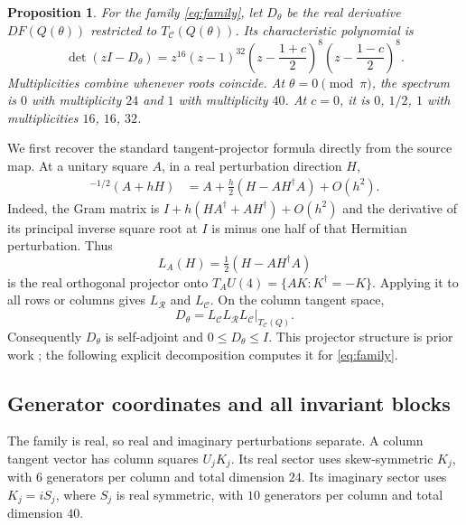\documentclass[11pt,a4paper]{article}
\newtheorem{proposition}{Proposition}
\newcommand{\adj}{^{\dagger}}
\newcommand{\TC}{T_{\mathcal C}}
\begin{document}
\begin{proposition}
\label{prop:spectrum}
For the family \eqref{eq:family}, let $D_\theta$ be the real derivative $DF(Q(\theta))$ restricted to $\TC(Q(\theta))$. Its characteristic polynomial is
\begin{equation}
 \det(zI-D_\theta)=z^{16}(z-1)^{32}
 \left(z-\frac{1+c}{2}\right)^8
 \left(z-\frac{1-c}{2}\right)^8.
 \label{eq:charpoly}
\end{equation}
Multiplicities combine whenever roots coincide. At $\theta=0\pmod\pi$, the spectrum is $0$ with multiplicity $24$ and $1$ with multiplicity $40$. At $c=0$, it is $0$, $1/2$, $1$ with multiplicities $16$, $16$, $32$.
\end{proposition}

We first recover the standard tangent-projector formula directly from the source map. At a unitary square $A$, in a real perturbation direction $H$,
\begin{align}
 [(A+hH)(A+hH)\adj]^{-1/2}(A+hH)
 &=A+\frac h2(H-AH\adj A)+O(h^2).
 \label{eq:derivative}
\end{align}
Indeed, the Gram matrix is $I+h(HA\adj+AH\adj)+O(h^2)$ and the derivative of its principal inverse square root at $I$ is minus one half of that Hermitian perturbation. Thus
\begin{equation}
 L_A(H)=\tfrac12(H-AH\adj A)
 \label{eq:projector}
\end{equation}
is the real orthogonal projector onto $T_AU(4)=\{AK:K\adj=-K\}$. Applying it to all rows or columns gives $L_{\mathcal R}$ and $L_{\mathcal C}$. On the column tangent space,
\begin{equation}
 D_\theta=L_{\mathcal C}L_{\mathcal R}L_{\mathcal C}
 \big|_{\TC(Q)}.
 \label{eq:compression}
\end{equation}
Consequently $D_\theta$ is self-adjoint and $0\le D_\theta\le I$. This projector structure is prior work \cite[Lemma 2.1 and Eq. (11)]{LewisMalick2008}; the following explicit decomposition computes it for \eqref{eq:family}.

\subsection{Generator coordinates and all invariant blocks}

The family is real, so real and imaginary perturbations separate. A column tangent vector has column squares $U_jK_j$. Its real sector uses skew-symmetric $K_j$, with $6$ generators per column and total dimension $24$. Its imaginary sector uses $K_j=iS_j$, where $S_j$ is real symmetric, with $10$ generators per column and total dimension $40$.
\end{document}
